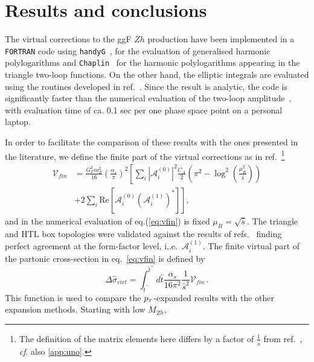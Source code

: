 \section{Results and conclusions} \label{sec:hzres}
The virtual corrections to the ggF $Zh$ production have been implemented in a  \texttt{FORTRAN} code using  \texttt{handyG}~\cite{Naterop:2019xaf}, for the evaluation of generalised harmonic polylogarithms and \texttt{Chaplin}~\cite{Buehler:2011ev} for the harmonic polylogarithms appearing in the triangle two-loop functions. 
On the other hand, the elliptic integrals are evaluated using the routines developed in
ref.~\cite{Bonciani:2018uvv}. Since the result is analytic, the code is significantly faster than the numerical evaluation of the two-loop amplitude~\cite{Chen:2020gae}, with evaluation time of ca. 0.1 sec per one phase space point on a personal laptop.
\par In order to facilitate the comparison of these results with the ones
presented in the literature, we define the finite part of the virtual corrections
as in
ref.~\cite{Davies:2020drs}\footnote{The definition of the matrix elements here
	differs by a factor of
	$\frac{1}{\hat{s}}$ from ref.~\cite{Davies:2020drs}, \textit{cf}. also
	\autoref{app:uno}.}
\begin{equation}
	\begin{split}
		\mathcal{V}_{fin}&=\frac{G_F^2 m_Z^2}{16}\left(\frac{\alpha_s}{\pi}\right)^2
		\left[ \sum_{i} \left|\mathcal{A}_i^{(0)} \right|^2\frac{C_A}{2}\left(\pi^2-
		\log^2\left(\frac{\mu_R^2}{\hat{s}}\right)\right)\right. \\
		& \left. +2\sum_i\text{Re}\left[\mathcal{A}_i^{(0)}\left(\mathcal{A}_i^{(1)}\right)^*\right]\right] ,
		\label{eq:vfin}
	\end{split}
\end{equation}
and in the numerical evaluation of eq.(\ref{eq:vfin}) is fixed
$\mu_R= \sqrt{\hat{s}}$.
The triangle and HTL box topologies were validated against the results of refs.~\cite{Hasselhuhn:2016rqt,Davies:2020drs} finding perfect
agreement at the form-factor level, i,.e.~$\mathcal{A}_i^{(1)}$. 
The finite virtual part of the partonic cross-section in eq.~\eqref{eq:vfin} is defined  by
\begin{equation}
	\Delta \hat{\sigma}_{virt}=
	\int_{\hat{t}^-}^{\hat{t}^+} d\hat{t}
	\frac{\alpha_s}{16\pi^2}\frac{1}{\hat{s}^2}\mathcal{V}_{fin}\, .
	\label{eq:deltasigma}
\end{equation}
This function is used to compare the $p_{\scriptscriptstyle T}$-expanded results with the other expansion methods. Starting with low $M_{Zh}$, 
